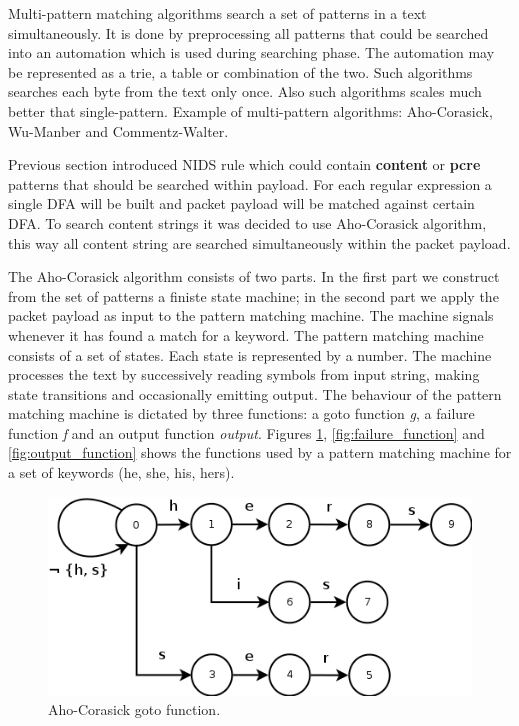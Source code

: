 \documentclass[thesis=M,english]{FITthesis}[2011/07/15]
\begin{document}
Multi-pattern matching algorithms search a set of patterns in a text simultaneously. It is done by preprocessing all patterns that could be searched into an automation which is used during searching phase. The automation may be represented as a trie, a table or combination of the two. Such algorithms searches each byte from the text only once. Also such algorithms scales much better that single-pattern. Example of multi-pattern algorithms: Aho-Corasick\cite{aho_corasick}, Wu-Manber and Commentz-Walter\cite{commwalter}.

Previous section introduced NIDS rule which could contain \textbf{content} or \textbf{pcre} patterns that should be searched within payload. For each regular expression a single DFA will be built and packet payload will be matched against certain DFA. To search content strings it was decided to use Aho-Corasick algorithm, this way all content string are searched simultaneously within the packet payload.

The Aho-Corasick algorithm consists of two parts. In the first part we construct from the set of patterns a finiste state machine; in the second part we apply the packet payload as input to the pattern matching machine. The machine signals whenever it has found a match for a keyword. The pattern matching machine consists of a set of states. Each state is represented by a number. The machine processes the text by successively reading symbols from input string, making state transitions and occasionally emitting output. The behaviour of the pattern matching machine is dictated by three functions: a goto function \emph{g}, a failure function \emph{f} and an output function \emph{output}. Figures \ref{fig:goto_function}, \ref{fig:failure_function} and \ref{fig:output_function} shows the functions used by a pattern matching machine for a set of keywords (he, she, his, hers).

\begin{figure}[h]
\centering
\includegraphics[scale=0.5]{images/goto_function.png}
\caption{Aho-Corasick goto function.}
\label{fig:goto_function}
\end{figure}
\end{document}
